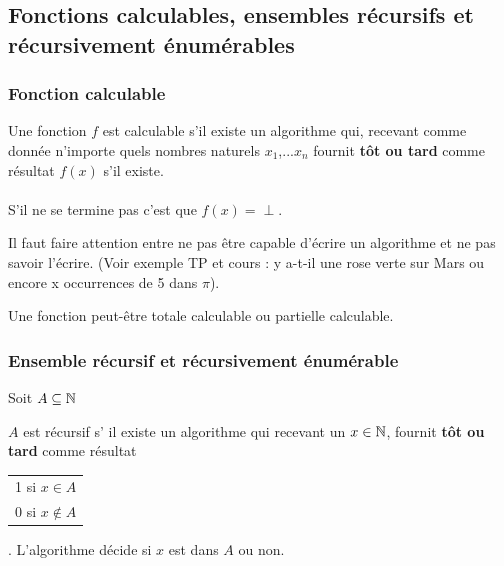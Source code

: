 \subsection{Fonctions calculables, ensembles récursifs et récursivement énumérables}
\label{sub:fonctions_calculables_ensembles_r_crusids_et_r_cursivement_num_rables}

\subsubsection{Fonction calculable}
\label{ssub:fonction_calculable}

\begin{mydef}
	Une fonction $f$ est calculable s’il existe un algorithme qui, recevant comme donnée
	n'importe quels nombres naturels $x_1$,...$x_n$ fournit \textbf{tôt ou tard} comme 
	résultat $f(x)$ s’il existe.
\end{mydef}
	
\paragraph{} S’il ne se termine pas c'est que $f(x)=\perp$. \\

\begin{myrem}
	Il faut faire attention entre ne pas être capable d'écrire un algorithme
	et ne pas savoir l'écrire. (Voir exemple TP et cours : y a-t-il une rose 
	verte sur Mars ou encore x occurrences de 5 dans $\pi$).
\end{myrem}

\begin{myrem}
	Une fonction peut-être totale calculable ou partielle calculable.
\end{myrem}


\subsubsection{Ensemble récursif et récursivement énumérable}
\label{ssub:ensemble_r_cursif_et_r_cursivement_num_rable}
Soit $A\subseteq \mathbb{N}$

\begin{mydef}
	$A$ est récursif s’ il existe un algorithme qui recevant un $x\in \mathbb{N}$,
	fournit \textbf{tôt ou tard} comme résultat 
	\begin{tabular}{l}
		1 si $x\in A$\\
		0 si $x\notin A$\\
	\end{tabular}
	. L'algorithme décide si $x$ est dans $A$ ou non.
\end{mydef}

